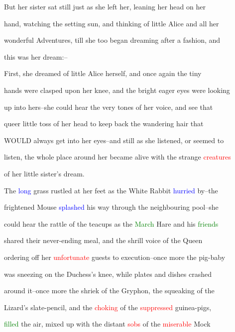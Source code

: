  But her sister sat still just as she left her, leaning her head on her

 hand, \textcolor{BurntOrange}{watching} the setting \textcolor{BurntOrange}{sun,} and thinking of little Alice and all her

 \textcolor{BurntOrange}{wonderful} \textcolor{BurntOrange}{Adventures,} till she too began dreaming after a fashion, and

 this was her dream:--



 First, she dreamed of little Alice herself, and once again the tiny

 hands were clasped upon her knee, and the bright \textcolor{BurntOrange}{eager} eyes were looking

 up into hers--she could hear the very tones of her voice, and see that

 queer little toss of her head to keep back the wandering hair that

 WOULD always get into her eyes--and still as she listened, or seemed to

 listen, the whole place around her became \textcolor{BurntOrange}{alive} with the strange \textcolor{red}{creatures}

 of her little sister’s dream.



 The \textcolor{blue}{long} grass rustled at her feet as the \textcolor{BurntOrange}{White} Rabbit \textcolor{blue}{hurried} by--the

 \textcolor{BurntOrange}{frightened} Mouse \textcolor{blue}{splashed} his way through the neighbouring pool--she

 could hear the rattle of the teacups as the \textcolor{green}{March} Hare and his \textcolor{green}{friends}

 \textcolor{BurntOrange}{shared} their never-ending meal, and the \textcolor{BurntOrange}{shrill} voice of the Queen

 ordering off her \textcolor{red}{unfortunate} guests to execution--once more the pig-baby

 was \textcolor{BurntOrange}{sneezing} on the Duchess’s knee, while plates and dishes crashed

 around it--once more the \textcolor{BurntOrange}{shriek} of the Gryphon, the squeaking of the

 Lizard’s slate-pencil, and the \textcolor{red}{choking} of the \textcolor{red}{suppressed} guinea-pigs,

 \textcolor{green}{filled} the air, mixed up with the distant \textcolor{red}{sobs} of the \textcolor{red}{miserable} Mock

